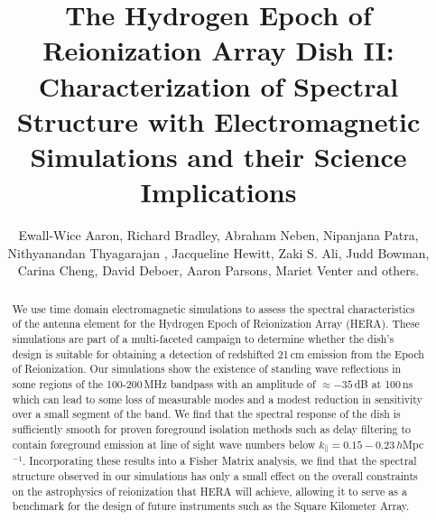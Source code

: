 \documentclass[twocolumn]{emulateapj}
\begin{document}
\title{The Hydrogen Epoch of Reionization Array Dish II: Characterization of Spectral Structure with Electromagnetic Simulations and their Science Implications}
\author{
Ewall-Wice Aaron,
Richard Bradley,
Abraham Neben,
Nipanjana Patra,
Nithyanandan Thyagarajan ,
Jacqueline Hewitt,
Zaki S. Ali,
Judd Bowman,
Carina Cheng,
David Deboer,
Aaron Parsons,
Mariet Venter
and others.
}

\begin{abstract}
We use time domain electromagnetic simulations to assess the spectral characteristics of the antenna element for the Hydrogen Epoch of Reionization Array (HERA). These simulations are part of a multi-faceted campaign to determine whether the dish's design is suitable for obtaining a detection of redshifted 21\,cm emission from the Epoch of Reionization. Our simulations show the existence of standing wave reflections in some regions of the 100-200\,MHz bandpass with an amplitude of $\approx -35$\,dB at 100\,ns which can lead to some loss of measurable modes and a modest reduction in sensitivity over a small segment of the band. We find that the spectral response of the dish is sufficiently smooth for proven foreground isolation methods such as delay filtering to contain foreground emission at line of sight wave numbers below $k_\parallel = 0.15-0.23$\,$h$Mpc$^{-1}$. Incorporating these results into a Fisher Matrix analysis, we find that the spectral structure observed in our simulations has only a small effect on the overall constraints on the astrophysics of reionization that HERA will achieve, allowing it to serve as a benchmark for the design of future instruments such as the Square Kilometer Array. 
\end{abstract}
\end{document}
